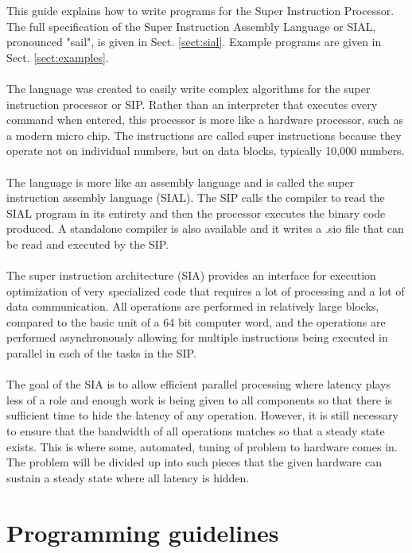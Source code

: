 \documentclass[12pt]{article}
\begin{document}
\noindent 
This guide explains how to write programs for the Super Instruction Processor. 
The full specification of the Super Instruction Assembly Language or SIAL, pronounced
"sail", is given in Sect. \ref{sect:sial}. Example programs are given
in Sect. \ref{sect:examples}.\\ 
\\ 
The language was created to easily write complex algorithms for the super instruction 
processor or SIP. Rather than an interpreter that executes every command when 
entered, this processor is more like a hardware processor, such as a modern micro chip. 
The instructions are called super instructions because they operate not on individual 
numbers, but on data blocks, typically 10,000 numbers.\\
\\ 
The language is more like an assembly language and is called the super instruction 
assembly language (SIAL). The SIP calls the compiler to read the SIAL program in its 
entirety and then the processor executes the binary code produced. A standalone compiler 
is also available and it writes a .sio file that can be read and executed by the SIP.\\
\\ 
The super instruction architecture (SIA) provides an interface for execution optimization 
of very specialized code that requires a lot of processing and a lot of data communication. 
All operations are performed in relatively large blocks, compared to the basic unit of a 
64 bit computer word, and the operations are performed asynchronously allowing for multiple 
instructions being executed in parallel in each of the tasks in the SIP.\\
\\ 
The goal of the SIA is to allow efficient parallel processing where latency plays less 
of a role and enough work is being given to all components so that there is sufficient 
time to hide the latency of any operation. However, it is still necessary to ensure 
that the bandwidth of all operations matches so that a steady state exists. 
This is where some, automated, tuning of problem to hardware comes in. The problem will 
be divided up into such pieces that the given hardware can sustain a steady state where all latency is hidden.\\

\section{\bf Programming guidelines}
\end{document}

